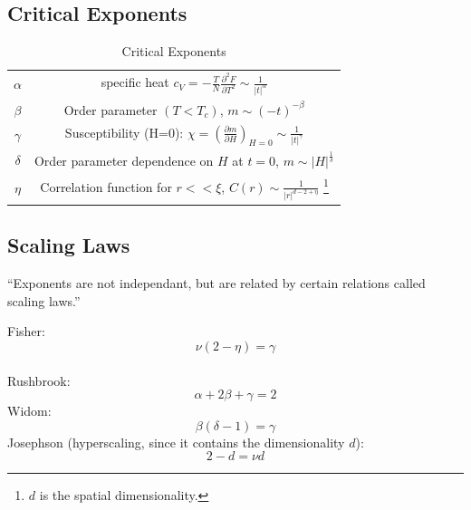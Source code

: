 \documentclass[11pt]{book}
\theoremstyle{definition}
\begin{document}
\subsection{Critical Exponents}

\begin{table}[h]
	\centering
	\caption{Critical Exponents}
	\label{tab:label}
	\begin{tabular}{cc} 
		$ \alpha $ & specific heat $ c_V = -\frac{T}{N} \frac{\partial ^2F}{\partial T^2}  \sim \frac{1}{|t|^{\alpha}} $ \\
		$\beta$ & Order parameter $(T<T_c)$,  $ m \sim (-t)^{-\beta} $ \\
		$\gamma$ & Susceptibility (H=0): $ \chi = \left( \frac{\partial m}{\partial H} \right)_{H=0} \sim \frac{1}{|t|^{\gamma}} $  \\
		$ \delta $ & Order parameter dependence on $ H $ at $ t=0 $, $ m \sim |H|^{\frac{1}{\delta}}$ \\ 
		$ \eta $ & Correlation function for $ r << \xi $, $C(r) \sim \frac{1}{|r|^{d-2+\eta}}$ \footnote{$ d $ is the spatial dimensionality.}
	\end{tabular}
\end{table}

\subsection{Scaling Laws}
``Exponents are not independant, but are related by certain relations called scaling laws.''

\begin{shaded*}
	Fisher: \[ \nu(2-\eta) = \gamma \] \\
Rushbrook: \[ \alpha + 2\beta + \gamma = 2 \] 
Widom:
\[ \beta(\delta-1) = \gamma \] 
Josephson (hyperscaling, since it contains the dimensionality $d$):
\[ 2-d = \nu d \] 
\end{shaded*}
\end{document}
